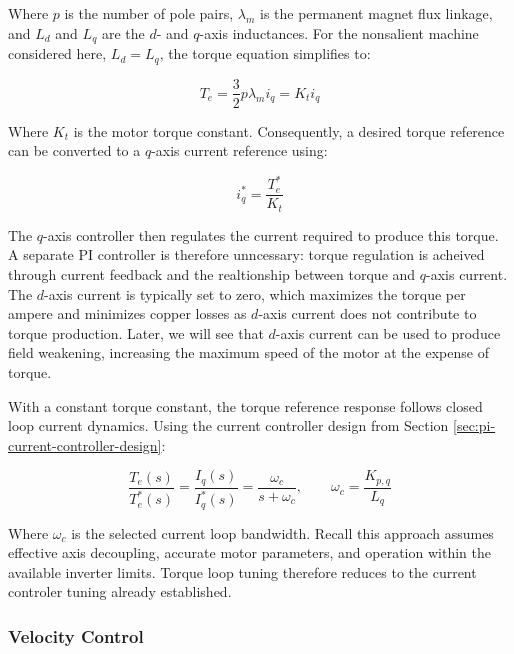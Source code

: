 \documentclass{article}
\begin{document}
Where $p$ is the number of pole pairs, $\lambda_m$ is the permanent magnet flux linkage, and $L_d$ and $L_q$ are the $d$- and $q$-axis inductances. For the nonsalient machine considered here, $L_d = L_q$, the torque equation simplifies to:

\begin{equation}
    T_e = \frac{3}{2}p\lambda_mi_q = K_ti_q
\end{equation}

Where $K_t$ is the motor torque constant. Consequently, a desired torque reference can be converted to a $q$-axis current reference using:

\begin{equation}
    i_q^* = \frac{T_e^*}{K_t}
\end{equation}

The $q$-axis controller then regulates the current required to produce this torque. A separate PI controller is therefore unncessary: torque regulation is acheived through current feedback and the realtionship between torque and $q$-axis current. The $d$-axis current is typically set to zero, which maximizes the torque per ampere and minimizes copper losses as $d$-axis current does not contribute to torque production. Later, we will see that $d$-axis current can be used to produce field weakening, increasing the maximum speed of the motor at the expense of torque.

With a constant torque constant, the torque reference response follows closed loop current dynamics. Using the current controller design from Section \ref{sec:pi-current-controller-design}:

\begin{equation}
    \frac{T_e(s)}{T_e^*(s)} = \frac{I_q(s)}{I_q^*(s)} = \frac{\omega_{c}}{s+\omega_{c}}, \qquad \omega_c = \frac{K_{p,q}}{L_q}
\end{equation}

Where $\omega_c$ is the selected current loop bandwidth. Recall this approach assumes effective axis decoupling, accurate motor parameters, and operation within the available inverter limits. Torque loop tuning therefore reduces to the current controler tuning already established.


\subsubsection{Velocity Control}
\label{sec:velocity-control}
\end{document}

